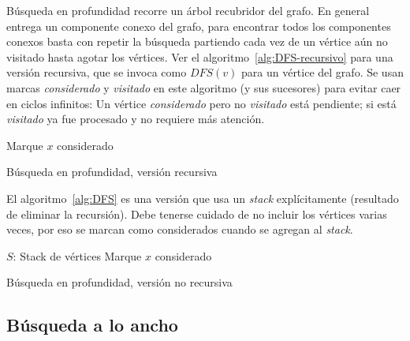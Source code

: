   Búsqueda en profundidad recorre un árbol recubridor del grafo.%
  En general entrega un componente conexo del grafo,%
  para encontrar todos los componentes conexos
  basta con repetir la búsqueda
  partiendo cada vez de un vértice aún no visitado
  hasta agotar los vértices.
  Ver el algoritmo~\ref{alg:DFS-recursivo}
  para una versión recursiva,
  que se invoca como \(DFS(v)\) para un vértice del grafo.
  Se usan marcas \emph{considerado}
  y \emph{visitado} en este algoritmo
  (y sus sucesores)
  para evitar caer en ciclos infinitos:
  Un vértice \emph{considerado} pero no \emph{visitado}
  está pendiente;
  si está \emph{visitado}
  ya fue procesado y no requiere más atención.
  \begin{algorithm}[htbp]
    \DontPrintSemicolon

    \KwProcedure {} \;
    \BlankLine
    Marque \(x\) considerado \;
    \caption{Búsqueda en profundidad,
	     versión recursiva}
    \label{alg:DFS-recursivo}
  \end{algorithm}
  El algoritmo~\ref{alg:DFS} es una versión
  que usa un \emph{\foreignlanguage{english}{stack}} explícitamente
  (resultado de eliminar la recursión).
  Debe tenerse cuidado de no incluir los vértices varias veces,
  por eso se marcan como considerados
  cuando se agregan al \emph{\foreignlanguage{english}{stack}}.
  \begin{algorithm}[htbp]
    \DontPrintSemicolon

    \KwProcedure {} \;
    \BlankLine
    \KwVariables \(S\): Stack de vértices \;
    \BlankLine
    Marque \(x\) considerado \;
     \;
    \caption{Búsqueda en profundidad,
	     versión no recursiva}
    \label{alg:DFS}
  \end{algorithm}

\subsection{Búsqueda a lo ancho}
\label{sec:BFS}

